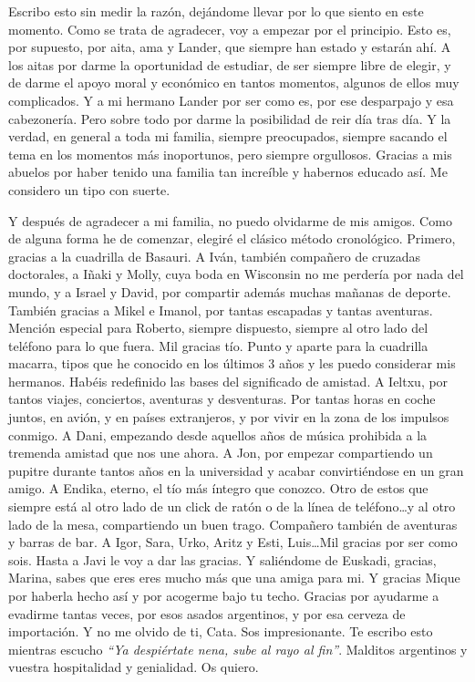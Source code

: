 
\begin{acknowledgementslong} 

Escribo esto sin medir la razón, dejándome llevar por lo que siento en este momento.
Como se trata de agradecer, voy a empezar por el principio. Esto es, por supuesto,
por aita, ama y Lander, que siempre han estado y estarán ahí. A los aitas por
darme la oportunidad de estudiar, de ser siempre libre de elegir, y de darme el
apoyo moral y económico en tantos momentos, algunos de ellos muy complicados. Y
a mi hermano Lander por ser como es, por ese desparpajo y esa cabezonería. Pero
sobre todo por darme la posibilidad de reir día tras día. Y la verdad, en general
a toda mi familia, siempre preocupados, siempre sacando el tema en los momentos
más inoportunos, pero siempre orgullosos. Gracias a mis abuelos por haber tenido
una familia tan increíble y habernos educado así. Me considero un tipo con suerte.

Y después de agradecer a mi familia, no puedo olvidarme de mis amigos. Como de
alguna forma he de comenzar, elegiré el clásico método cronológico. Primero,
gracias a la cuadrilla de Basauri. A Iván, también compañero de cruzadas doctorales,
a Iñaki y Molly, cuya boda en Wisconsin no me perdería por nada del mundo, y a
Israel y David, por compartir además muchas mañanas de deporte. También gracias
a Mikel e Imanol, por tantas escapadas y tantas aventuras. Mención especial para
Roberto, siempre dispuesto, siempre al otro lado del teléfono para lo que fuera.
Mil gracias tío. Punto y aparte para la cuadrilla macarra, tipos que he conocido
en los últimos 3 años y les puedo considerar mis hermanos. Habéis redefinido las
bases del significado de amistad. A Ieltxu, por tantos viajes, conciertos,
aventuras y desventuras. Por tantas horas en coche juntos, en avión, y en
países extranjeros, y por vivir en la zona de los impulsos conmigo. A Dani,
empezando desde aquellos años de música prohibida a la tremenda 
amistad que nos une ahora. A Jon, por empezar compartiendo un pupitre durante 
tantos años en la universidad y acabar convirtiéndose en un gran amigo. A Endika, 
eterno, el tío más íntegro que conozco. Otro de estos que siempre está al otro
lado de un click de ratón o de la línea de teléfono\dots y al otro lado de la
mesa, compartiendo un buen trago. Compañero también de aventuras y barras de bar.
A Igor, Sara, Urko, Aritz y Esti, Luis\dots Mil gracias por ser como sois. Hasta
a Javi le voy a dar las gracias. Y saliéndome de Euskadi, gracias, Marina, sabes
que eres eres mucho más que una amiga para mi. Y gracias Mique por haberla hecho
así y por acogerme bajo tu techo. Gracias por ayudarme a evadirme tantas veces,
por esos asados argentinos, y por esa cerveza de importación. Y no me olvido de
ti, Cata. Sos impresionante. Te escribo esto mientras escucho \textit{``Ya
despiértate nena, sube al rayo al fin''}. Malditos argentinos y vuestra
hospitalidad y genialidad. Os quiero.


\end{acknowledgementslong}
